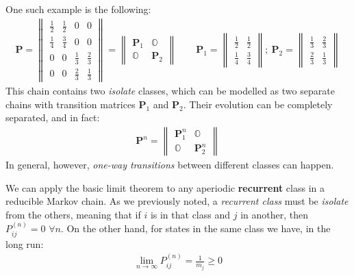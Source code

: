 \documentclass[../template.tex]{subfiles}
\begin{document}
One such example is the following:
\begin{align*}
    \textbf{P} = \begin{Vmatrix}
        \frac{1}{2} & \frac{1}{2} & 0 & 0\\
        \frac{1}{4} & \frac{3}{4} & 0 & 0\\
        0 & 0 & \frac{1}{3} & \frac{2}{3}\\
        0 & 0 & \frac{2}{3} & \frac{1}{3}        
    \end{Vmatrix} = \begin{Vmatrix}
        \textbf{P}_1 & \mathbb{O}\\
        \mathbb{O} & \textbf{P}_2  
    \end{Vmatrix}
    \qquad \textbf{P}_1 = \begin{Vmatrix}
        \frac{1}{2} & \frac{1}{2}\\
        \frac{1}{4} & \frac{3}{4}    
    \end{Vmatrix};\> \textbf{P}_2 = \begin{Vmatrix}
        \frac{1}{3} & \frac{2}{3}\\
        \frac{2}{3} & \frac{1}{3}    
    \end{Vmatrix} 
\end{align*}
This chain contains two \textit{isolate} classes, which can be modelled as two separate chains with transition matrices $\textbf{P}_1$ and $\textbf{P}_2$. Their evolution can be completely separated, and in fact:
\begin{align*}
    \textbf{P}^n = \begin{Vmatrix}
        \textbf{P}_1^n & \mathbb{O}\\
        \mathbb{O} & \textbf{P}_2^n   
    \end{Vmatrix} 
\end{align*} 
In general, however, \textit{one-way transitions} between different classes can happen. 

\medskip

We can apply the basic limit theorem to any aperiodic \textbf{recurrent} class in a reducible Markov chain. As we previously noted, a \textit{recurrent class} must be \textit{isolate} from the others, meaning that if $i$ is in that class and $j$ in another, then $P_{ij}^{(n)} = 0$ $\forall n$. On the other hand, for states in the same class we have, in the long run:
\begin{align} \label{eqn:basic-limit1}
    \lim_{n \to \infty} P_{ij}^{(n)} = \frac{1}{m_j} \geq 0 
\end{align}  
\end{document}
